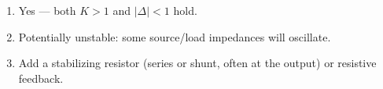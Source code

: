 \begin{enumerate}[leftmargin=1.6em,itemsep=2pt]
\item Yes --- both $K > 1$ and $|\Delta| < 1$ hold.
\item Potentially unstable: some source/load impedances will oscillate.
\item Add a stabilizing resistor (series or shunt, often at the output) or resistive feedback.
\end{enumerate}
